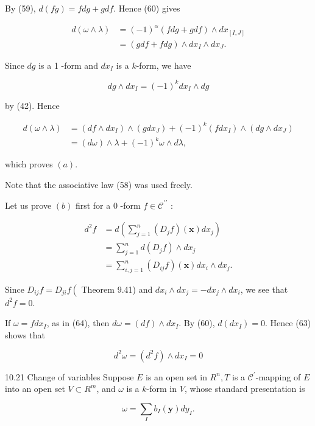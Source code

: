 \documentclass[10pt]{article}
\begin{document}
By (59), $d(f g)=f d g+g d f$. Hence (60) gives

$$
\begin{aligned}
d(\omega \wedge \lambda) & =(-1)^{\alpha}(f d g+g d f) \wedge d x_{[I, J]} \\
& =(g d f+f d g) \wedge d x_{I} \wedge d x_{J} .
\end{aligned}
$$

Since $d g$ is a 1 -form and $d x_{I}$ is a $k$-form, we have

$$
d g \wedge d x_{I}=(-1)^{k} d x_{I} \wedge d g
$$

by (42). Hence

$$
\begin{aligned}
d(\omega \wedge \lambda) & =\left(d f \wedge d x_{I}\right) \wedge\left(g d x_{J}\right)+(-1)^{k}\left(f d x_{I}\right) \wedge\left(d g \wedge d x_{J}\right) \\
& =(d \omega) \wedge \lambda+(-1)^{k} \omega \wedge d \lambda,
\end{aligned}
$$

which proves $(a)$.

Note that the associative law (58) was used freely.

Let us prove $(b)$ first for a 0 -form $f \in \mathscr{C}^{\prime \prime}$ :

$$
\begin{aligned}
d^{2} f & =d\left(\sum_{j=1}^{n}\left(D_{j} f\right)(\mathbf{x}) d x_{j}\right) \\
& =\sum_{j=1}^{n} d\left(D_{j} f\right) \wedge d x_{j} \\
& =\sum_{i, j=1}^{n}\left(D_{i j} f\right)(\mathbf{x}) d x_{i} \wedge d x_{j} .
\end{aligned}
$$

Since $D_{i j} f=D_{j i} f\left(\right.$ Theorem 9.41) and $d x_{i} \wedge d x_{j}=-d x_{j} \wedge d x_{i}$, we see that $d^{2} f=0$.

If $\omega=f d x_{I}$, as in (64), then $d \omega=(d f) \wedge d x_{I}$. By (60), $d\left(d x_{I}\right)=0$. Hence (63) shows that

$$
d^{2} \omega=\left(d^{2} f\right) \wedge d x_{I}=0
$$

10.21 Change of variables Suppose $E$ is an open set in $R^{n}, T$ is a $\mathscr{C}^{\prime}$-mapping of $E$ into an open set $V \subset R^{m}$, and $\omega$ is a $k$-form in $V$, whose standard presentation is

$$
\omega=\sum_{I} b_{I}(\mathbf{y}) d y_{I} .
$$
\end{document}
